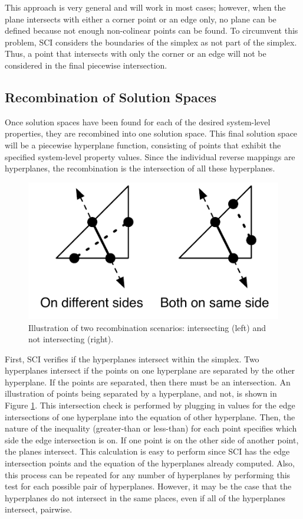 This approach is very general and will work in most cases; however, when the plane intersects with either a corner point or an edge only, no plane can be defined because not enough non-colinear points can be found.
To circumvent this problem, SCI considers the boundaries of the simplex as not part of the simplex.
Thus, a point that intersects with only the corner or an edge will not be considered in the final piecewise intersection.

\subsection{Recombination of Solution Spaces}

Once solution spaces have been found for each of the desired system-level properties, they are recombined into one solution space.
This final solution space will be a piecewise hyperplane function, consisting of points that exhibit the specified system-level property values.
Since the individual reverse mappings are hyperplanes, the recombination is the intersection of all these hyperplanes.


\begin{figure}[ht]
\centering
\includegraphics[scale=1]{images/intcheck.pdf}
\caption{Illustration of two recombination scenarios: intersecting (left) and not intersecting (right).}
\label{fig:intcheck}
\end{figure}


First, SCI verifies if the hyperplanes intersect within the simplex.
Two hyperplanes intersect if the points on one hyperplane are separated by the other hyperplane.
If the points are separated, then there must be an intersection.
An illustration of points being separated by a hyperplane, and not, is shown in Figure \ref{fig:intcheck}.
This intersection check is performed by plugging in values for the edge intersections of one hyperplane into the equation of other hyperplane.
Then, the nature of the inequality (greater-than or less-than) for each point specifies which side the edge intersection is on.
If one point is on the other side of another point, the planes intersect.
This calculation is easy to perform since SCI has the edge intersection points and the equation of the hyperplanes already computed.
Also, this process can be repeated for any number of hyperplanes by performing this test for each possible pair of hyperplanes.
However, it may be the case that the hyperplanes do not intersect in the same places, even if all of the  hyperplanes intersect, pairwise.



